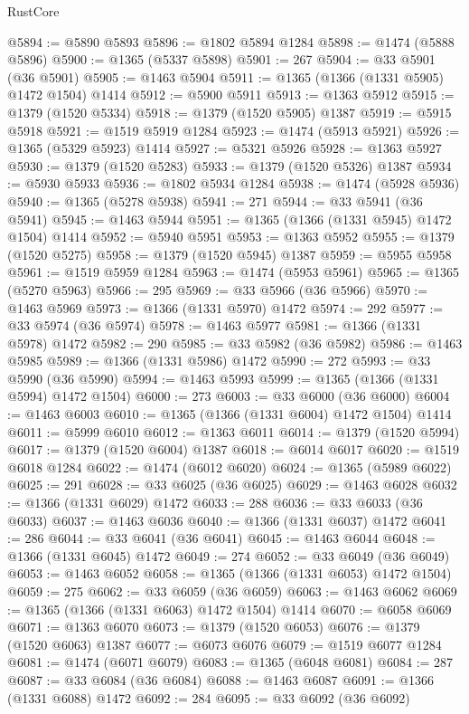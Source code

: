 \begin{lexlean}{RustCore}
\begin{coremodule}
@5894 := @5890 @5893
@5896 := @1802 @5894 @1284
@5898 := @1474 (@5888 @5896)
@5900 := @1365 (@5337 @5898)
@5901 := 267
@5904 := @33 @5901 (@36 @5901)
@5905 := @1463 @5904
@5911 := @1365 (@1366 (@1331 @5905) @1472 @1504) @1414
@5912 := @5900 @5911
@5913 := @1363 @5912
@5915 := @1379 (@1520 @5334)
@5918 := @1379 (@1520 @5905) @1387
@5919 := @5915 @5918
@5921 := @1519 @5919 @1284
@5923 := @1474 (@5913 @5921)
@5926 := @1365 (@5329 @5923) @1414
@5927 := @5321 @5926
@5928 := @1363 @5927
@5930 := @1379 (@1520 @5283)
@5933 := @1379 (@1520 @5326) @1387
@5934 := @5930 @5933
@5936 := @1802 @5934 @1284
@5938 := @1474 (@5928 @5936)
@5940 := @1365 (@5278 @5938)
@5941 := 271
@5944 := @33 @5941 (@36 @5941)
@5945 := @1463 @5944
@5951 := @1365 (@1366 (@1331 @5945) @1472 @1504) @1414
@5952 := @5940 @5951
@5953 := @1363 @5952
@5955 := @1379 (@1520 @5275)
@5958 := @1379 (@1520 @5945) @1387
@5959 := @5955 @5958
@5961 := @1519 @5959 @1284
@5963 := @1474 (@5953 @5961)
@5965 := @1365 (@5270 @5963)
@5966 := 295
@5969 := @33 @5966 (@36 @5966)
@5970 := @1463 @5969
@5973 := @1366 (@1331 @5970) @1472
@5974 := 292
@5977 := @33 @5974 (@36 @5974)
@5978 := @1463 @5977
@5981 := @1366 (@1331 @5978) @1472
@5982 := 290
@5985 := @33 @5982 (@36 @5982)
@5986 := @1463 @5985
@5989 := @1366 (@1331 @5986) @1472
@5990 := 272
@5993 := @33 @5990 (@36 @5990)
@5994 := @1463 @5993
@5999 := @1365 (@1366 (@1331 @5994) @1472 @1504)
@6000 := 273
@6003 := @33 @6000 (@36 @6000)
@6004 := @1463 @6003
@6010 := @1365 (@1366 (@1331 @6004) @1472 @1504) @1414
@6011 := @5999 @6010
@6012 := @1363 @6011
@6014 := @1379 (@1520 @5994)
@6017 := @1379 (@1520 @6004) @1387
@6018 := @6014 @6017
@6020 := @1519 @6018 @1284
@6022 := @1474 (@6012 @6020)
@6024 := @1365 (@5989 @6022)
@6025 := 291
@6028 := @33 @6025 (@36 @6025)
@6029 := @1463 @6028
@6032 := @1366 (@1331 @6029) @1472
@6033 := 288
@6036 := @33 @6033 (@36 @6033)
@6037 := @1463 @6036
@6040 := @1366 (@1331 @6037) @1472
@6041 := 286
@6044 := @33 @6041 (@36 @6041)
@6045 := @1463 @6044
@6048 := @1366 (@1331 @6045) @1472
@6049 := 274
@6052 := @33 @6049 (@36 @6049)
@6053 := @1463 @6052
@6058 := @1365 (@1366 (@1331 @6053) @1472 @1504)
@6059 := 275
@6062 := @33 @6059 (@36 @6059)
@6063 := @1463 @6062
@6069 := @1365 (@1366 (@1331 @6063) @1472 @1504) @1414
@6070 := @6058 @6069
@6071 := @1363 @6070
@6073 := @1379 (@1520 @6053)
@6076 := @1379 (@1520 @6063) @1387
@6077 := @6073 @6076
@6079 := @1519 @6077 @1284
@6081 := @1474 (@6071 @6079)
@6083 := @1365 (@6048 @6081)
@6084 := 287
@6087 := @33 @6084 (@36 @6084)
@6088 := @1463 @6087
@6091 := @1366 (@1331 @6088) @1472
@6092 := 284
@6095 := @33 @6092 (@36 @6092)

\end{coremodule}
\end{lexlean}
